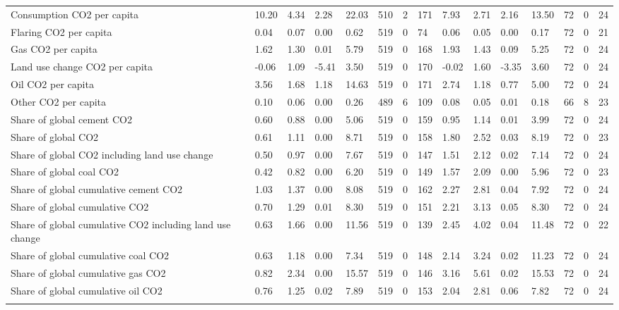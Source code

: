 \begin{longtable}{lllllllllllllll}
Consumption CO2 per capita & 10.20 & 4.34 & 2.28 & 22.03 & 510 & 2 & 171 & 7.93 & 2.71 & 2.16 & 13.50 & 72 & 0 & 24\\
\addlinespace
Flaring CO2 per capita & 0.04 & 0.07 & 0.00 & 0.62 & 519 & 0 & 74 & 0.06 & 0.05 & 0.00 & 0.17 & 72 & 0 & 21\\
Gas CO2 per capita & 1.62 & 1.30 & 0.01 & 5.79 & 519 & 0 & 168 & 1.93 & 1.43 & 0.09 & 5.25 & 72 & 0 & 24\\
Land use change CO2 per capita & -0.06 & 1.09 & -5.41 & 3.50 & 519 & 0 & 170 & -0.02 & 1.60 & -3.35 & 3.60 & 72 & 0 & 24\\
Oil CO2 per capita & 3.56 & 1.68 & 1.18 & 14.63 & 519 & 0 & 171 & 2.74 & 1.18 & 0.77 & 5.00 & 72 & 0 & 24\\
Other CO2 per capita & 0.10 & 0.06 & 0.00 & 0.26 & 489 & 6 & 109 & 0.08 & 0.05 & 0.01 & 0.18 & 66 & 8 & 23\\
\addlinespace
Share of global cement CO2 & 0.60 & 0.88 & 0.00 & 5.06 & 519 & 0 & 159 & 0.95 & 1.14 & 0.01 & 3.99 & 72 & 0 & 24\\
Share of global CO2 & 0.61 & 1.11 & 0.00 & 8.71 & 519 & 0 & 158 & 1.80 & 2.52 & 0.03 & 8.19 & 72 & 0 & 23\\
Share of global CO2 including land use change & 0.50 & 0.97 & 0.00 & 7.67 & 519 & 0 & 147 & 1.51 & 2.12 & 0.02 & 7.14 & 72 & 0 & 24\\
Share of global coal CO2 & 0.42 & 0.82 & 0.00 & 6.20 & 519 & 0 & 149 & 1.57 & 2.09 & 0.00 & 5.96 & 72 & 0 & 23\\
Share of global cumulative cement CO2 & 1.03 & 1.37 & 0.00 & 8.08 & 519 & 0 & 162 & 2.27 & 2.81 & 0.04 & 7.92 & 72 & 0 & 24\\
\addlinespace
Share of global cumulative CO2 & 0.70 & 1.29 & 0.01 & 8.30 & 519 & 0 & 151 & 2.21 & 3.13 & 0.05 & 8.30 & 72 & 0 & 24\\
Share of global cumulative CO2 including land use change & 0.63 & 1.66 & 0.00 & 11.56 & 519 & 0 & 139 & 2.45 & 4.02 & 0.04 & 11.48 & 72 & 0 & 22\\
Share of global cumulative coal CO2 & 0.63 & 1.18 & 0.00 & 7.34 & 519 & 0 & 148 & 2.14 & 3.24 & 0.02 & 11.23 & 72 & 0 & 24\\
Share of global cumulative gas CO2 & 0.82 & 2.34 & 0.00 & 15.57 & 519 & 0 & 146 & 3.16 & 5.61 & 0.02 & 15.53 & 72 & 0 & 24\\
Share of global cumulative oil CO2 & 0.76 & 1.25 & 0.02 & 7.89 & 519 & 0 & 153 & 2.04 & 2.81 & 0.06 & 7.82 & 72 & 0 & 24\\
\addlinespace

\end{longtable}
